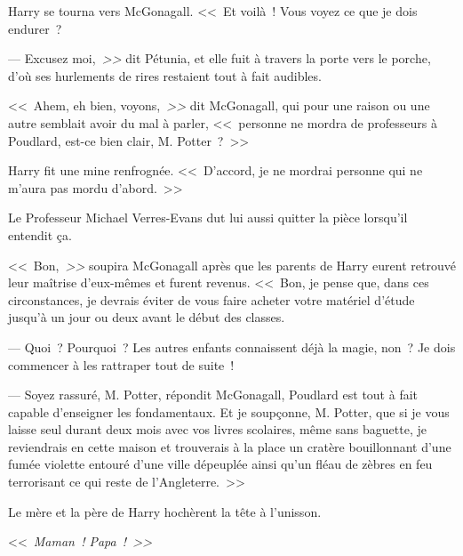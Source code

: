 Harry se tourna vers McGonagall. <<~Et voilà~! Vous voyez ce que je dois endurer~?

--- Excusez moi,\emph{~>>} dit Pétunia, et elle fuit à travers la porte vers le porche, d'où ses hurlements de rires restaient tout à fait audibles.

<<~Ahem, eh bien, voyons,\emph{~>>} dit McGonagall, qui pour une raison ou une autre semblait avoir du mal à parler, <<~personne ne mordra de professeurs à Poudlard, est-ce bien clair, M. Potter~?~>>

Harry fit une mine renfrognée. <<~D'accord, je ne mordrai personne qui ne m'aura pas mordu d'abord.~>>

Le Professeur Michael Verres-Evans dut lui aussi quitter la pièce lorsqu'il entendit ça.

<<~Bon,\emph{~>>} soupira McGonagall après que les parents de Harry eurent retrouvé leur maîtrise d'eux-mêmes et furent revenus. <<~Bon, je pense que, dans ces circonstances, je devrais éviter de vous faire acheter votre matériel d'étude jusqu'à un jour ou deux avant le début des classes.

--- Quoi~? Pourquoi~? Les autres enfants connaissent déjà la magie, non~? Je dois commencer à les rattraper tout de suite~!

--- Soyez rassuré, M. Potter, répondit McGonagall, Poudlard est tout à fait capable d'enseigner les fondamentaux. Et je soupçonne, M. Potter, que si je vous laisse seul durant deux mois avec vos livres scolaires, même sans baguette, je reviendrais en cette maison et trouverais à la place un cratère bouillonnant d'une fumée violette entouré d'une ville dépeuplée ainsi qu'un fléau de zèbres en feu terrorisant ce qui reste de l'Angleterre.~>>

Le mère et la père de Harry hochèrent la tête à l'unisson.

<<~\emph{Maman~! Papa~!~>>} 

